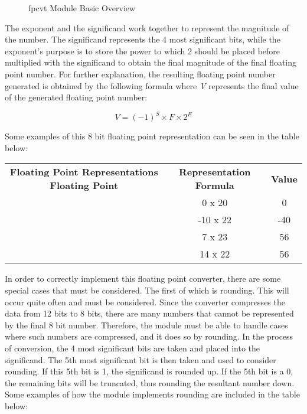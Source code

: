 \documentclass{article}
\begin{document}
\begin{figure}[H]
\begin{center}
\caption{fpcvt Module Basic Overview}
\end{center}
\end{figure}

The exponent and the significand work together to represent the magnitude of the number.  The significand represents the 4 most significant bits, while the exponent's purpose is to store the power to which 2 should be placed before multiplied with the significand to obtain the final magnitude of the final floating point number.  For further explanation, the resulting floating point number generated is obtained by the following formula where \textit{V} represents the final value of the generated floating point number: 

\begin{center}
\[ V  =  (-1)^S \times F \times 2^E \]
\end{center}

Some examples of this 8 bit floating point representation can be seen in the table below:

\begin{center}
\begin{tabular}{ c c c }

\textbf{Floating Point Representations}
 \textbf{Floating Point} & \textbf{Representation Formula} & \textbf{Value} \\ 
\big[0 000 0000\big] & 0 x 20 & 0\\  
\big[1 010 1010\big]  & -10 x 22 & -40 \\
\big[0 011 0111\big] & 7 x 23 & 56\\
\big[0 010 1110\big] & 14 x 22 & 56\\

\end{tabular}
\end{center}

In order to correctly implement this floating point converter, there are some special cases that must be considered.  The first of which is rounding.  This will occur quite often and must be considered.  Since the converter compresses the data from 12 bits to 8 bits, there are many numbers that cannot be represented by the final 8 bit number.  Therefore, the module must be able to handle cases where such numbers are compressed, and it does so by rounding.  In the process of conversion, the 4 most significant bits are taken and placed into the significand.  The 5th most significant bit is then taken and used to consider rounding.  If this 5th bit is 1, the significand is rounded up.  If the 5th bit is a 0, the remaining bits will be truncated, thus rounding the resultant number down.  Some examples of how the module implements rounding are included in the table below:
\end{document}
